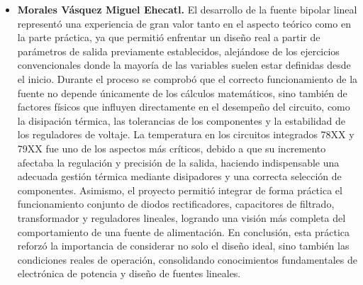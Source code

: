 \documentclass[journal]{IEEEtran}
\begin{document}
\begin{itemize}
    \item \textbf{Morales Vásquez Miguel Ehecatl.} 
    \newline El desarrollo de la fuente bipolar lineal representó una experiencia de gran valor tanto en el aspecto teórico como en la parte práctica, ya que permitió enfrentar un diseño real a partir de parámetros de salida previamente establecidos, alejándose de los ejercicios convencionales donde la mayoría de las variables suelen estar definidas desde el inicio. Durante el proceso se comprobó que el correcto funcionamiento de la fuente no depende únicamente de los cálculos matemáticos, sino también de factores físicos que influyen directamente en el desempeño del circuito, como la disipación térmica, las tolerancias de los componentes y la estabilidad de los reguladores de voltaje. La temperatura en los circuitos integrados 78XX y 79XX fue uno de los aspectos más críticos, debido a que su incremento afectaba la regulación y precisión de la salida, haciendo indispensable una adecuada gestión térmica mediante disipadores y una correcta selección de componentes. Asimismo, el proyecto permitió integrar de forma práctica el funcionamiento conjunto de diodos rectificadores, capacitores de filtrado, transformador y reguladores lineales, logrando una visión más completa del comportamiento de una fuente de alimentación. En conclusión, esta práctica reforzó la importancia de considerar no solo el diseño ideal, sino también las condiciones reales de operación, consolidando conocimientos fundamentales de electrónica de potencia y diseño de fuentes lineales.

\end{itemize}




%
\end{document}
